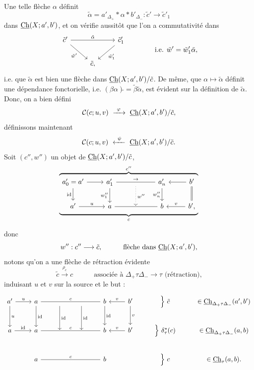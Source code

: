 Une telle flèche $\alpha$ définit
\[
\tilde{\alpha} = a'_{\Delta_{+}} \ast \alpha \ast b'_{\Delta_{-}} : \tilde{c}' \longrightarrow \tilde{c}'_1
\]
dans $\underline{\mathrm{Ch}}(X;a',b')$, et on vérifie
aussitôt que l'on a commutativité dans
\[
\begin{tikzcd}
\tilde{c}' \ar[rr,"\tilde{\alpha}"] \ar[dr,"\tilde{w}'"'] & & \tilde{c}'_1 \ar[dl,"\tilde{w}'_1"] \\
& \tilde{c}, &
\end{tikzcd}
\qquad\qquad \text{i.e. } \tilde{w}' = \tilde{w}'_1\tilde{\alpha},
\]
i.e. que $\tilde{\alpha}$ est bien une flèche dans $\underline{\mathrm{Ch}}(X;a',b')/\tilde{c}$. De même, que $\alpha \longmapsto \tilde{\alpha}$ définit une dépendance fonctorielle, i.e. $(\beta\alpha)\tilde{} = \tilde{\beta}\tilde{\alpha}$, est évident sur la définition de $\tilde{\alpha}$. Donc, on a bien défini %
\[
\cC(c;u,v) \ \xrightarrow{\ \varphi\ }\ \Ch(X;a',b')/\tilde{c},
\]
définissons maintenant
\[
\cC(c;u,v) \ \xleftarrow{\ \psi\ }\ \Ch(X;a',b')/\tilde{c}.
\]
Soit $(c'',w'')$ un objet de $\underline{\mathrm{Ch}}(X;a',b')/\tilde{c}$,
\[
\overbrace{\underbrace{\begin{tikzcd}[ampersand replacement=\&]
a'_0 = a' \ar[r] \ar[d,"\mathrm{id}"'] \& a'_1 \ar[rr,no head,"\rightarrow"] \ar[d,"w''_1"'] \& {} \ar[d,dotted,"w''"] \& a'_n \ar[d,"w''_n"'] \& b' \ar[l] \ar[d,equal] \\
a' \ar[r,"u"] \& a \ar[rr,no head] \& {} \& b \& b', \ar[l,"v"']
\end{tikzcd}}_{c}}^{c''}
\]

donc
\[
w'' : c'' \longrightarrow \tilde{c}, \qquad\quad \text{flèche dans } \underline{\mathrm{Ch}}(X;a',b'),
\]
notons qu'on a une flèche de rétraction évidente
\[
\tilde{c} \xrightarrow{\rho_c} c \qquad\quad \text{associée à } \Delta_{+}\tau\Delta_{-} \longrightarrow \tau \text{ (rétraction),}
\]
induisant $u$ et $v$ sur la source et le but :
\[
\begin{tikzcd}
a' \ar[r,"u"] \ar[d,"u"] & a \ar[rrr,no head,"c"] \ar[d,"\mathrm{id}"] & {} \ar[d,"\mathrm{id}"] & {} \ar[d,"\mathrm{id}"] & b \ar[d,"\mathrm{id}"] & b' \ar[l,"v"'] \ar[d,"v"] & \Big\}\ \tilde{c} & \in \Ch_{\Delta_{+}\tau\Delta_{-}}(a',b') \\
a \ar[r,"\mathrm{id}"] & a \ar[rrr,no head,"c"] & {} & {} & b & b' \ar[l,"v"'] & \Big\}\ \delta^{*}_{\tau}(c) & \in \Ch_{\Delta_{+}\tau\Delta_{-}}(a,b) \\
& a \ar[rrr,no head,"c"] & & & b & & \Big\}\ c & \in \Ch_{\tau}(a,b).
\end{tikzcd}
\]

